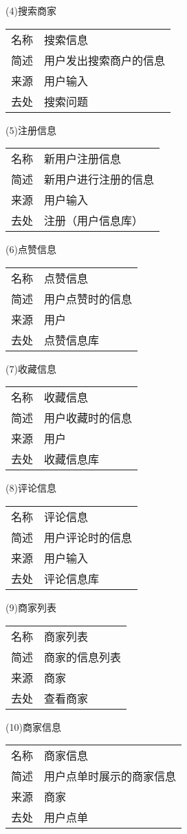 (4)搜索商家

\begin{longtable}[]{@{}ll@{}}
\toprule
名称 & 搜索信息\tabularnewline
简述 & 用户发出搜索商户的信息\tabularnewline
来源 & 用户输入\tabularnewline
去处 & 搜索问题\tabularnewline
\bottomrule
\end{longtable}

(5)注册信息

\begin{longtable}[]{@{}ll@{}}
\toprule
名称 & 新用户注册信息\tabularnewline
简述 & 新用户进行注册的信息\tabularnewline
来源 & 用户输入\tabularnewline
去处 & 注册（用户信息库）\tabularnewline
\bottomrule
\end{longtable}

(6)点赞信息

\begin{longtable}[]{@{}ll@{}}
\toprule
名称 & 点赞信息\tabularnewline
简述 & 用户点赞时的信息\tabularnewline
来源 & 用户\tabularnewline
去处 & 点赞信息库\tabularnewline
\bottomrule
\end{longtable}

(7)收藏信息

\begin{longtable}[]{@{}ll@{}}
\toprule
名称 & 收藏信息\tabularnewline
简述 & 用户收藏时的信息\tabularnewline
来源 & 用户\tabularnewline
去处 & 收藏信息库\tabularnewline
\bottomrule
\end{longtable}

(8)评论信息

\begin{longtable}[]{@{}ll@{}}
\toprule
名称 & 评论信息\tabularnewline
简述 & 用户评论时的信息\tabularnewline
来源 & 用户输入\tabularnewline
去处 & 评论信息库\tabularnewline
\bottomrule
\end{longtable}

(9)商家列表

\begin{longtable}[]{@{}ll@{}}
\toprule
名称 & 商家列表\tabularnewline
简述 & 商家的信息列表\tabularnewline
来源 & 商家\tabularnewline
去处 & 查看商家\tabularnewline
\bottomrule
\end{longtable}

(10)商家信息

\begin{longtable}[]{@{}ll@{}}
\toprule
名称 & 商家信息\tabularnewline
简述 & 用户点单时展示的商家信息\tabularnewline
来源 & 商家\tabularnewline
去处 & 用户点单\tabularnewline
\bottomrule
\end{longtable}

